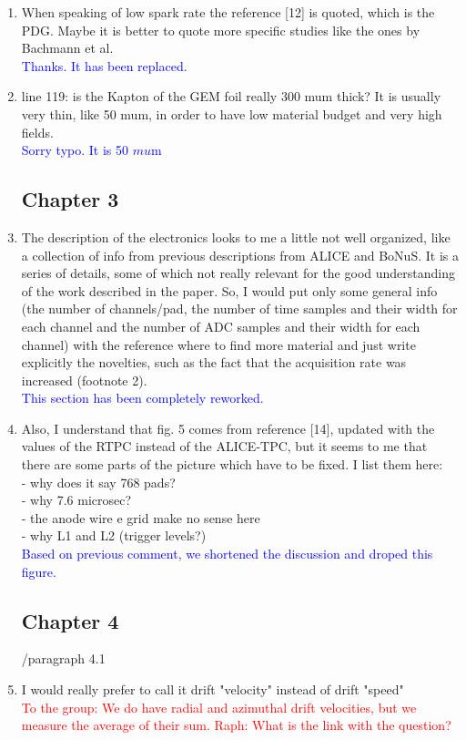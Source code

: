 \documentclass[a4paper,11pt,twoside]{article}
\begin{document}
\begin{enumerate}
\item When speaking of low spark rate the reference [12] is quoted, which is 
   the PDG. Maybe it is better to quote more specific studies like the ones by 
   Bachmann et al.\\
\textcolor{blue}{Thanks. It has been replaced.} 

\item line 119: is the Kapton of the GEM foil really 300 mum thick? It is 
   usually very thin, like 50 mum, in order to have low material budget and 
   very high fields.\\
\textcolor{blue}{Sorry typo. It is 50 $mu$m} 

\subsection*{ Chapter 3}
\item The description of the electronics looks to me a little not well 
   organized, like a collection of info from previous descriptions from ALICE 
   and BoNuS. It is a series of details, some of which not really relevant for 
   the good understanding of the work described in the paper. So, I would put 
   only some general info (the number of channels/pad, the number of time 
   samples and their width for each channel and the number of  ADC samples and 
   their width for each channel) with the reference where to find more material 
   and just write explicitly the novelties, such as the fact that the 
   acquisition rate was increased (footnote 2).\\
\textcolor{blue}{This section has been completely reworked.} 

\item Also, I understand that fig. 5 comes from reference [14], updated with 
   the values of the RTPC instead of the ALICE-TPC, but it seems to me that 
   there are some parts of the picture which have to be fixed. I list them 
   here:\\
- why does it say 768 pads?\\
- why 7.6 microsec?\\
- the anode wire e grid make no sense here\\
- why L1 and L2 (trigger levels?) \\
\textcolor{blue}{Based on previous comment, we shortened the discussion and 
droped this figure. } 

\subsection*{ Chapter 4}
	/paragraph 4.1
\item I would really prefer to call it drift "velocity" instead of drift 
   "speed"\\
\textcolor{red}{To the group: We do have radial and azimuthal drift velocities, 
but we measure the average of their sum. Raph: What is the link with the question?} 


\end{enumerate}
\end{document}
